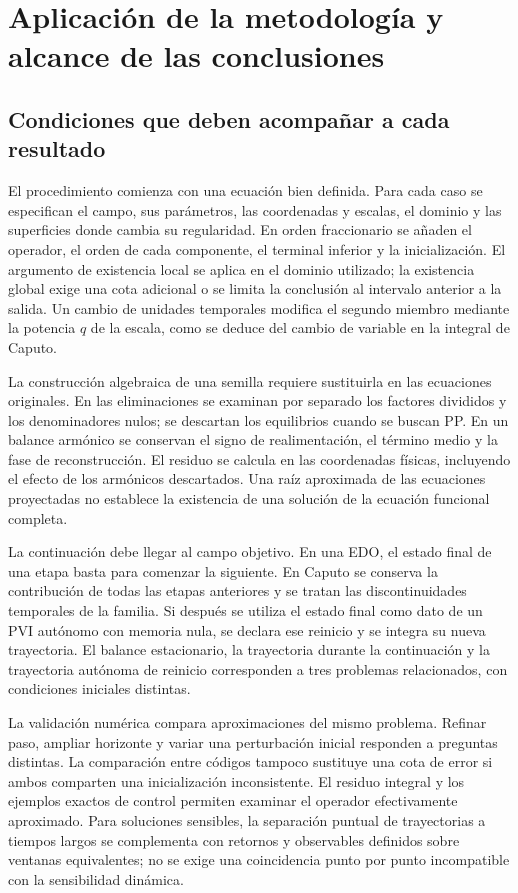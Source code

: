 \section{Aplicación de la metodología y alcance de las conclusiones}
\label{bre:closing}

\subsection{Condiciones que deben acompañar a cada resultado}

El procedimiento comienza con una ecuación bien definida. Para cada caso
se especifican el campo, sus parámetros, las coordenadas y escalas, el
dominio y las superficies donde cambia su regularidad. En orden
fraccionario se añaden el operador, el orden de cada componente, el
terminal inferior y la inicialización. El argumento de existencia local
se aplica en el dominio utilizado; la existencia global exige una cota
adicional o se limita la conclusión al intervalo anterior a la salida.
Un cambio de unidades temporales modifica el segundo miembro mediante
la potencia $q$ de la escala, como se deduce del cambio de variable en
la integral de Caputo.

La construcción algebraica de una semilla requiere sustituirla en las
ecuaciones originales. En las eliminaciones se examinan por separado
los factores divididos y los denominadores nulos; se descartan los
equilibrios cuando se buscan PP. En un balance armónico se conservan el
signo de realimentación, el término medio y la fase de reconstrucción.
El residuo se calcula en las coordenadas físicas, incluyendo el efecto
de los armónicos descartados. Una raíz aproximada de las ecuaciones
proyectadas no establece la existencia de una solución de la ecuación
funcional completa.

La continuación debe llegar al campo objetivo. En una EDO, el estado final
de una etapa basta para comenzar la siguiente. En Caputo se conserva la
contribución de todas las etapas anteriores y se tratan las discontinuidades
temporales de la familia. Si después se utiliza el estado final como dato
de un PVI autónomo con memoria nula, se declara ese reinicio y se integra
su nueva trayectoria. El balance estacionario, la trayectoria durante la
continuación y la trayectoria autónoma de reinicio corresponden a tres
problemas relacionados, con condiciones iniciales distintas.

La validación numérica compara aproximaciones del mismo problema.
Refinar paso, ampliar horizonte y variar una perturbación inicial
responden a preguntas distintas. La comparación entre códigos tampoco
sustituye una cota de error si ambos comparten una inicialización
inconsistente. El residuo integral y los ejemplos exactos de control
permiten examinar el operador efectivamente aproximado. Para soluciones
sensibles, la separación puntual de trayectorias a tiempos largos se
complementa con retornos y observables definidos sobre ventanas
equivalentes; no se exige una coincidencia punto por punto incompatible
con la sensibilidad dinámica.

